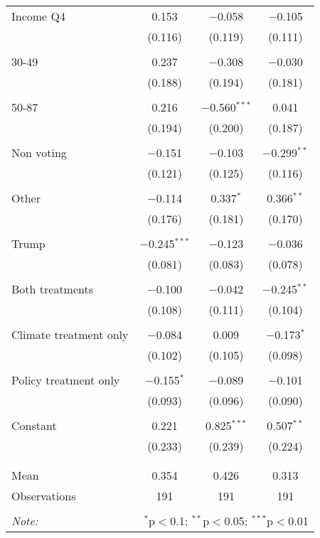 \begin{tabular}{@{\extracolsep{5pt}}lccc}
 Income Q4 & 0.153 & $-$0.058 & $-$0.105 \\ 
  & (0.116) & (0.119) & (0.111) \\ 
  & & & \\ 
 30-49 & 0.237 & $-$0.308 & $-$0.030 \\ 
  & (0.188) & (0.194) & (0.181) \\ 
  & & & \\ 
 50-87 & 0.216 & $-$0.560$^{***}$ & 0.041 \\ 
  & (0.194) & (0.200) & (0.187) \\ 
  & & & \\ 
 Non voting & $-$0.151 & $-$0.103 & $-$0.299$^{**}$ \\ 
  & (0.121) & (0.125) & (0.116) \\ 
  & & & \\ 
 Other & $-$0.114 & 0.337$^{*}$ & 0.366$^{**}$ \\ 
  & (0.176) & (0.181) & (0.170) \\ 
  & & & \\ 
 Trump & $-$0.245$^{***}$ & $-$0.123 & $-$0.036 \\ 
  & (0.081) & (0.083) & (0.078) \\ 
  & & & \\ 
 Both treatments & $-$0.100 & $-$0.042 & $-$0.245$^{**}$ \\ 
  & (0.108) & (0.111) & (0.104) \\ 
  & & & \\ 
 Climate treatment only & $-$0.084 & 0.009 & $-$0.173$^{*}$ \\ 
  & (0.102) & (0.105) & (0.098) \\ 
  & & & \\ 
 Policy treatment only & $-$0.155$^{*}$ & $-$0.089 & $-$0.101 \\ 
  & (0.093) & (0.096) & (0.090) \\ 
  & & & \\ 
 Constant & 0.221 & 0.825$^{***}$ & 0.507$^{**}$ \\ 
  & (0.233) & (0.239) & (0.224) \\ 
  & & & \\ 
\hline \\[-1.8ex] 
Mean & 0.354 & 0.426 & 0.313 \\ 
Observations & 191 & 191 & 191 \\ 
\hline 
\hline \\[-1.8ex] 
\textit{Note:}  & \multicolumn{3}{r}{$^{*}$p$<$0.1; $^{**}$p$<$0.05; $^{***}$p$<$0.01} \\ 
\end{tabular} 

